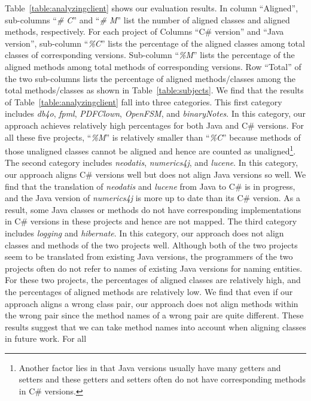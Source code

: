 Table~\ref{table:analyzingclient} shows our evaluation results.
In column ``Aligned'', sub-columns ``\emph{\# C}'' and
``\emph{\# M}'' list the number of aligned classes and aligned methods, respectively.
For each project of Columns ``C\# version'' and ``Java version'', sub-column ``\emph{\%C}'' lists the
percentage of the aligned classes among total classes of
corresponding versions. Sub-column ``\emph{\%M}'' lists the
percentage of the aligned methods among total methods of
corresponding versions. Row ``Total'' of the two sub-columns lists
the percentage of aligned methods/classes among the total
methods/classes as shown in Table~\ref{table:subjects}. We find that
the results of Table~\ref{table:analyzingclient} fall into three
categories. This first category includes \emph{db4o}, \emph{fpml},
\emph{PDFClown}, \emph{OpenFSM}, and \emph{binaryNotes}. In this category, our
approach achieves relatively high percentages for both Java
and C\# versions. For all these five projects, ``\emph{\%M}'' is
relatively smaller than ``\emph{\%C}'' because methods of those
unaligned classes cannot be aligned and hence are counted as
unaligned\footnote{Another factor lies in that Java versions usually
have many getters and setters and these getters and setters often do
not have corresponding methods in C\# versions.}. The second
category includes \emph{neodatis}, \emph{numerics4j}, and
\emph{lucene}. In this category, our approach aligns C\# versions well but does
not align Java versions so well. We find that the translation of \emph{neodatis} and
\emph{lucene} from Java to C\# is in progress, and the
Java version of \emph{numerics4j} is more up to date than its
C\# version. As a result, some Java classes or methods do not have
corresponding implementations in C\# versions in these projects and
hence are not mapped. The third category includes \emph{logging}
and \emph{hibernate}. In this category, our approach does not align classes and
methods of the two projects well. Although both of the two projects
seem to be translated from existing Java versions, the programmers of
the two projects often do not refer to names of existing Java
versions for naming entities. For these two projects, the
percentages of aligned classes are relatively high, and the percentages
of aligned methods are relatively low. We find that even if our
approach aligns a wrong class pair, our approach does not align
methods within the wrong pair since the method names of a wrong pair
are quite different. These results suggest that we can take method
names into account when aligning classes in future work. For all
